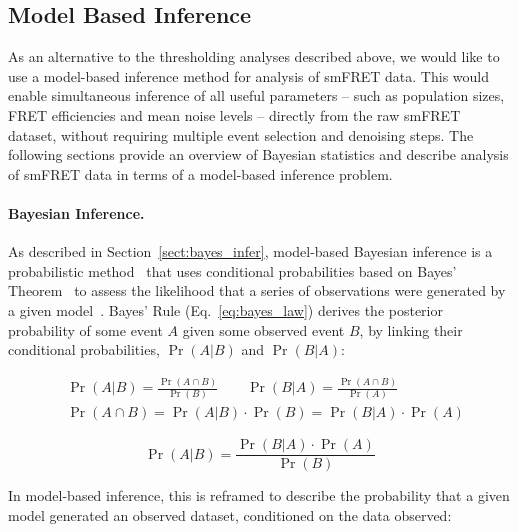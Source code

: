 
\subsection{Model Based Inference}
\label{sect:model_based_inference}
As an alternative to the thresholding analyses described above, we would like to use a model-based inference method for analysis of smFRET data. This would enable simultaneous inference of all useful parameters -- such as population sizes, FRET efficiencies and mean noise levels -- directly from the raw smFRET dataset, without requiring multiple event selection and denoising steps. The following sections provide an overview of Bayesian statistics and describe analysis of smFRET data in terms of a model-based inference problem. 

\paragraph{Bayesian Inference.}
As described in Section~\ref{sect:bayes_infer}, model-based Bayesian inference is a probabilistic method~\cite{barber12} that uses conditional probabilities based on Bayes' Theorem~\cite{bayes63} to assess the likelihood that a series of observations were generated by a given model~\cite{mackay03}. Bayes' Rule (Eq.~\ref{eq:bayes_law}) derives the posterior probability of some event $A$ given some observed event $B$,  by linking their conditional probabilities, $\Pr(A|B)$ and $\Pr(B|A)$: 

\begin{equation}
\begin{aligned}
& \Pr(A|B) = \frac{\Pr(A \cap B)}{\Pr(B)} \qquad \Pr(B|A) = \frac{\Pr(A \cap B)}{\Pr(A)} \\
& \Pr(A \cap B) = \Pr(A|B) \cdot \Pr(B) = \Pr(B|A) \cdot \Pr(A)
\end{aligned}
\label{eq:conditional}
\end{equation} 

\begin{equation}
\Pr(A|B) = \frac{\Pr(B|A) \cdot \Pr(A)}{\Pr(B)} 
\label{eq:bayes_law}
\end{equation}

In model-based inference, this is reframed to describe the probability that a given model generated an observed dataset, conditioned on the data observed:


